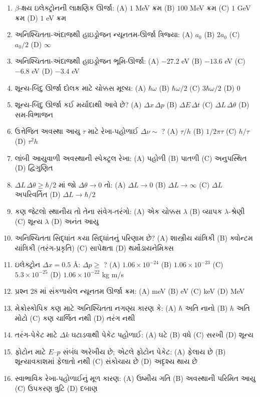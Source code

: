 \begin{enumerate}[label=\textbf{\arabic*.}]
  \item $\beta$-ક્ષય ઇલેક્ટ્રોનની લાક્ષણિક ઊર્જા: (A) $1$ MeV ક્રમ (B) $100$ MeV ક્રમ (C) $1$ GeV ક્રમ (D) $1$ eV ક્રમ
  \item અનિશ્ચિતતા-અંદાજથી હાઇડ્રોજન ન્યૂનતમ-ઊર્જા ત્રિજ્યા: (A) $a_0$ (B) $2a_0$ (C) $a_0/2$ (D) $\infty$
  \item અનિશ્ચિતતા-અંદાજથી હાઇડ્રોજન ભૂમિ-ઊર્જા: (A) $-27.2$ eV (B) $-13.6$ eV (C) $-6.8$ eV (D) $-3.4$ eV
  \item શૂન્ય-બિંદુ ઊર્જા દોલક માટે ચોક્કસ મૂલ્ય: (A) $\hbar\omega$ (B) $\hbar\omega/2$ (C) $3\hbar\omega/2$ (D) $0$
  \item શૂન્ય-બિંદુ ઊર્જા કઈ મર્યાદાથી આવે છે? (A) $\Delta x\,\Delta p$ (B) $\Delta E\,\Delta t$ (C) $\Delta L\,\Delta\theta$ (D) સમ-વિભાજન
  \item ઉત્તેજિત અવસ્થા આયુ $\tau$ માટે રેખા-પહોળાઈ $\Delta\nu\sim$ ? (A) $\tau/h$ (B) $1/2\pi\tau$ (C) $h/\tau$ (D) $\tau^2h$
  \item લાંબી આયુવાળી અવસ્થાની સ્પેક્ટ્રલ રેખા: (A) પહોળી (B) પાતળી (C) અનુપસ્થિત (D) દ્વિગુણિત
  \item $\Delta L\,\Delta\theta\ge\hbar/2$ માં જો $\Delta\theta\to0$ તો: (A) $\Delta L\to0$ (B) $\Delta L\to\infty$ (C) $\Delta L$ અપરિવર્તિત (D) $\Delta L\to\hbar/2$
  \item કણ જેટલો સ્થાનીય તો તેના સંવેગ-તરંગો: (A) એક ચોક્કસ $\lambda$ (B) વ્યાપક $\lambda$-શ્રેણી (C) શૂન્ય $\lambda$ (D) અનંત આયુ
  \item અનિશ્ચિતતા સિદ્ધાંત કયા સિદ્ધાંતનું પરિણામ છે? (A) શાસ્ત્રીય યાંત્રિકી (B) ક્વોન્ટમ યાંત્રિકી (તરંગ-પ્રકૃતિ) (C) સાપેક્ષતા (D) થર્મોડાયનેમિક્સ
  \item ઇલેક્ટ્રોન $\Delta x=0.5$ Å: $\Delta p\ge$ ? (A) $1.06\times10^{-24}$ (B) $1.06\times10^{-23}$ (C) $5.3\times10^{-25}$ (D) $1.06\times10^{-22}$ kg m/s
  \item પ્રશ્ન 28 માં સંકળાયેલ ન્યૂનતમ ઊર્જા ક્રમ: (A) meV (B) eV (C) keV (D) MeV
  \item મેક્રોસ્કોપિક કણ માટે અનિશ્ચિતતા નગણ્ય કારણ કે: (A) $\hbar$ અતિ નાનો (B) $h$ અતિ મોટો (C) કણ ચાર્જિત નથી (D) તરંગ નથી
  \item તરંગ-પેકેટ માટે $\Delta k$ ઘટાડવાથી પેકેટ પહોળાઈ: (A) ઘટે (B) વધે (C) સરખી (D) શૂન્ય
  \item ફોટોન માટે $E$--$p$ સંબંધ અરેખીય છે; એટલે ફોટોન પેકેટ: (A) ફેલાય છે (B) શૂન્યાવકાશમાં ફેલાતો નથી (C) સંકોચાય છે (D) અદૃશ્ય થાય છે
  \item સ્વાભાવિક રેખા-પહોળાઈનું મૂળ કારણ: (A) ઉષ્મીય ગતિ (B) અવસ્થાની પરિમિત આયુ (C) ઉપકરણ ત્રુટિ (D) દબાણ

\end{enumerate}
